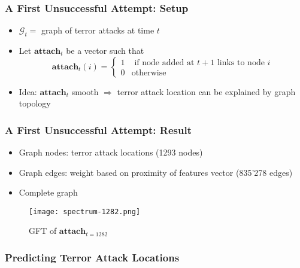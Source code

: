 \begin{frame}
\frametitle{A First Unsuccessful Attempt: Setup}

\begin{itemize}

\item $\mathcal{G}_t = $ graph of terror attacks at time $t$

\item Let $\textbf{attach}_t$ be a vector such that
\begin{equation}
\textbf{attach}_t(i)= \begin{cases}
1 		& \text{ if node added at } t+1 \text{ links to node }i \\
0		& \text{otherwise}
\end{cases}
\end{equation}

\item Idea: $\textbf{attach}_t$ smooth $\Rightarrow$ terror attack location can be explained by graph topology 

\end{itemize}
\end{frame}

\begin{frame}
\frametitle{A First Unsuccessful Attempt: Result}

\begin{itemize}
\item Graph nodes: terror attack locations (1293 nodes)
\item Graph edges: weight based on proximity of features vector (835'278 edges)
\item Complete graph
\end{itemize}
\begin{figure}[H]
\begin{center}
\texttt{[image: spectrum-1282.png]}
\caption{GFT of $\textbf{attach}_{t=1282}$}
\label{fig:spectrum-1282}
\end{center}
\end{figure}

\end{frame}

\begin{frame}
\frametitle{Predicting Terror Attack Locations}

\end{frame}